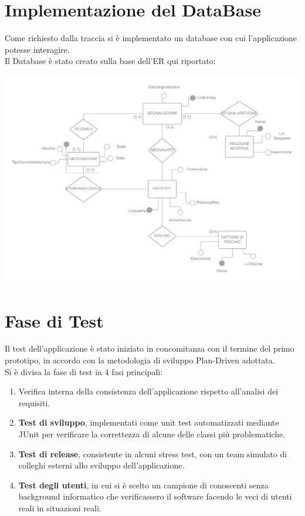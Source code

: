 \documentclass[11pt]{article}
\begin{document}
    \section{Implementazione del DataBase}
    Come richiesto dalla traccia si è implementato un database con cui l'applicazione potesse interagire.\\
    Il Database è stato creato sulla base dell'ER qui riportato:
        \begin{center}
            \includegraphics[width=1\textwidth]{pictures/_Diagramma vuoto.png}
        \end{center}

\newpage
    \section{Fase di Test}
    Il test dell'applicazione è stato iniziato in concomitanza con il termine del primo prototipo, in accordo con la metodologia di sviluppo Plan-Driven adottata.\\
    Si è divisa la fase di test in 4 fasi principali:
        \begin{enumerate}
            \item Verifica interna della consistenza dell'applicazione rispetto all'analisi dei requisiti.
            \item \textbf{Test di sviluppo}, implementati come unit test automatizzati mediante JUnit per verificare la correttezza di
            alcune delle classi più problematiche.
            \item \textbf{Test di release}, consistente in alcuni stress test, con un team simulato di colleghi esterni allo sviluppo dell'applicazione.
            \item \textbf{Test degli utenti}, in cui si è scelto un campione di conoscenti senza background informatico che verificassero il software facendo le veci di utenti reali in situazioni reali.
        \end{enumerate}
    
\end{document}
